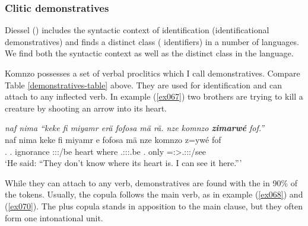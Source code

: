 \subsubsection{Clitic demonstratives} \label{demonstrative-identifiers}

Diessel (\citeyear{Diessel:2009tg}) includes the syntactic context of identification (identificational demonstratives) and finds a distinct class ( identifiers) in a number of languages. We find both the syntactic context as well as the distinct class in the language.%

Komnzo possesses a set of  verbal proclitics which I call  demonstratives. Compare Table \ref{demonstratives-table} above. They are used for identification and can attach to any inflected verb. In example (\ref{ex067}) two brothers are trying to kill a creature by shooting an arrow into its heart.

\begin{exe}
	\ex \emph{naf nima ``keke fi miyamr erä fofosa mä rä. nze komnzo \textbf{zimarwé} fof.''}\\
	\gll naf nima keke fi miyamr e fofosa mä  nze komnzo z=ywé fof\\
	\Tsg.\Erg{} \Quot{} \Neg{} \Third.\Abs{} ignorance \Stpl:\Sbj:\Nonpast:\Ipfv/be heart where \Tsg.\F:\Sbj:\Nonpast:\Ipfv.be \Fsg.\Erg{} only \Prox=\Fsg:\Sbj>\Tsg.\Masc:\Obj:\Nonpast:\Ipfv/see \Emph{}\\
	\trans `He said: ``They don't know where its heart is. I can see it here.'''\\ 
	\label{ex067}
\end{exe}

While they can attach to any verb,  demonstratives are found with the  in 90\% of the tokens. Usually, the copula follows the main verb, as in example (\ref{ex068}) and (\ref{ex070}). The   plus copula stands in apposition to the main clause, but they often form one intonational unit.

